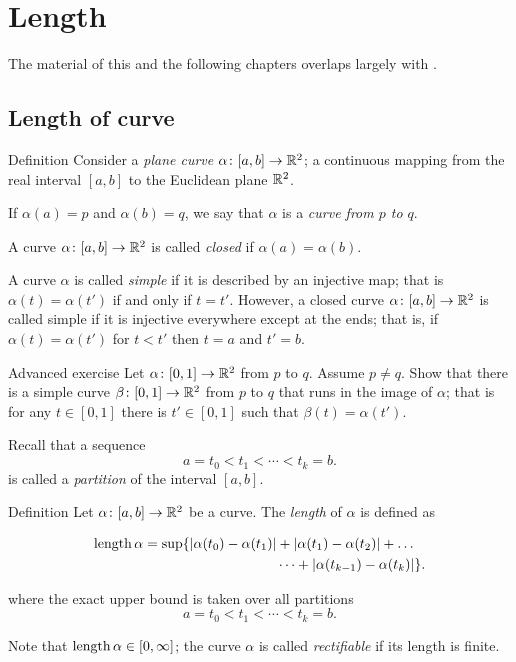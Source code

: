 
\chapter{Length}

The material of this and the following chapters overlaps largely with \cite[Chapter 5]{fuchs-tabachnikov}.

\section{Length of curve}


\begin{thm}{Definition}\label{def:curve}
Consider a \emph{plane curve} $\alpha\:[a,b]\z\to \RR^2$; a continuous mapping from the real interval $[a,b]$ to the Euclidean plane $\mathbb{R}^2$. 


If $\alpha(a)=p$ and $\alpha(b)=q$,
we say that $\alpha$ is a \emph{curve from $p$ to $q$}.

A curve $\alpha\colon[a,b]\to \mathbb{R}^2$ is called \emph{closed} if $\alpha(a)=\alpha(b)$.

A curve $\alpha$ is called \emph{simple} if it is described by an injective map;
that is $\alpha(t)=\alpha(t')$ if and only if $t=t'$.
However, a closed curve $\alpha\colon[a,b]\to \mathbb{R}^2$ is called simple if it is injective 
everywhere except at the ends; that is, if
$\alpha(t)=\alpha(t')$ for $t<t'$ then $t=a$ and $t'=b$.

\end{thm}

\begin{thm}{Advanced exercise}
Let $\alpha\colon[0,1]\to\mathbb{R}^2$  from $p$ to $q$.
Assume $p\ne q$.
Show that there is a simple curve $\beta\colon[0,1]\to\mathbb{R}^2$  from $p$ to $q$
that runs in the image of $\alpha$;
that is for any $t\in [0,1]$ there is $t'\in [0,1]$ such that $\beta(t)=\alpha(t')$.
\end{thm}

 
Recall that a sequence 
\[a=t_0 < t_1 < \cdots < t_k=b.\]
is called a \emph{partition} of the interval $[a,b]$.

\begin{thm}{Definition}\label{def:length}
Let $\alpha\colon[a,b]\to \mathbb{R}^2$ be a curve.
The \emph{length} of $\alpha$ is defined as

\begin{align*}
\mathop{\rm length}\nolimits \alpha
= 
\sup \{|\alpha(t_0)-\alpha(t_1)|&+|\alpha(t_1)-\alpha(t_2)|+\dots
\\
&\dots+|\alpha(t_{k-1})-\alpha(t_k)|\}. 
\end{align*}

where the exact upper bound is taken over all partitions
\[a=t_0 < t_1 < \cdots < t_k=b.\]

Note that $\mathop{\rm length}\nolimits\alpha\in[0,\infty]$;
the curve $\alpha$ is called \emph{rectifiable} if its length is finite.
\end{thm}

